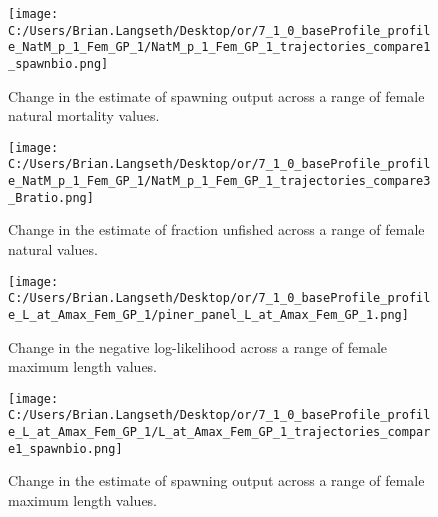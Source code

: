 \documentclass[11pt,
  english,
  a4paper,
]{article}
\begin{document}
\tagmcend\tagstructend


\begin{figure}
\centering
\texttt{[image: C:/Users/Brian.Langseth/Desktop/or/7\_1\_0\_baseProfile\_profile\_NatM\_p\_1\_Fem\_GP\_1/NatM\_p\_1\_Fem\_GP\_1\_trajectories\_compare1\_spawnbio.png]}
\caption{Change in the estimate of spawning output across a range of female natural mortality values.\label{fig:m-ssb}}
\end{figure}

\tagmcend\tagstructend


\begin{figure}
\centering
\texttt{[image: C:/Users/Brian.Langseth/Desktop/or/7\_1\_0\_baseProfile\_profile\_NatM\_p\_1\_Fem\_GP\_1/NatM\_p\_1\_Fem\_GP\_1\_trajectories\_compare3\_Bratio.png]}
\caption{Change in the estimate of fraction unfished across a range of female natural values.\label{fig:m-depl}}
\end{figure}

\tagmcend\tagstructend


\begin{figure}
\centering
\texttt{[image: C:/Users/Brian.Langseth/Desktop/or/7\_1\_0\_baseProfile\_profile\_L\_at\_Amax\_Fem\_GP\_1/piner\_panel\_L\_at\_Amax\_Fem\_GP\_1.png]}
\caption{Change in the negative log-likelihood across a range of female maximum length values.\label{fig:linf-profile}}
\end{figure}

\tagmcend\tagstructend


\begin{figure}
\centering
\texttt{[image: C:/Users/Brian.Langseth/Desktop/or/7\_1\_0\_baseProfile\_profile\_L\_at\_Amax\_Fem\_GP\_1/L\_at\_Amax\_Fem\_GP\_1\_trajectories\_compare1\_spawnbio.png]}
\caption{Change in the estimate of spawning output across a range of female maximum length values.\label{fig:linf-ssb}}
\end{figure}
\end{document}
